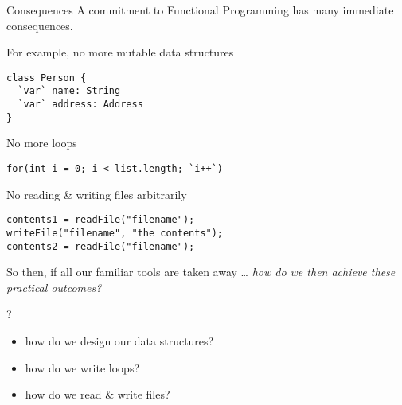 \begin{frame}
\begin{block}{Consequences}
A commitment to Functional Programming has many immediate consequences.
\end{block}
\end{frame}

\begin{frame}[fragile]
\begin{block}{For example, no more mutable data structures}
\begin{lstlisting}[style=java]
class Person {
  `var` name: String
  `var` address: Address
}
\end{lstlisting}
\end{block}
\end{frame}

\begin{frame}[fragile]
\begin{block}{No more loops}
\begin{lstlisting}[style=java]
for(int i = 0; i < list.length; `i++`)
\end{lstlisting}
\end{block}
\end{frame}

\begin{frame}[fragile]
\begin{block}{No reading \& writing files arbitrarily}
\begin{lstlisting}[style=java]
contents1 = readFile("filename");
writeFile("filename", "the contents");
contents2 = readFile("filename");
\end{lstlisting}
\end{block}

\end{frame}
\begin{frame}
\begin{block}{So then, if all our familiar tools are taken away \ldots}
\emph{how do we then achieve these practical outcomes?}
\end{block}
\end{frame}

\begin{frame}
\begin{block}{?}
\begin{itemize}
\item how do we design our data structures?
\item how do we write loops?
\item how do we read \& write files?
\end{itemize}
\end{block}
\end{frame}
